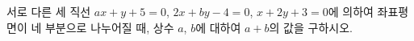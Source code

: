 서로 다른 세 직선 $ax+y+5=0$, $2x+by-4=0$, $x+2y+3=0$에 의하여 좌표평면이 네 부분으로 나누어질 때, 상수 $a$, $b$에 대하여 $a+b$의 값을 구하시오.
